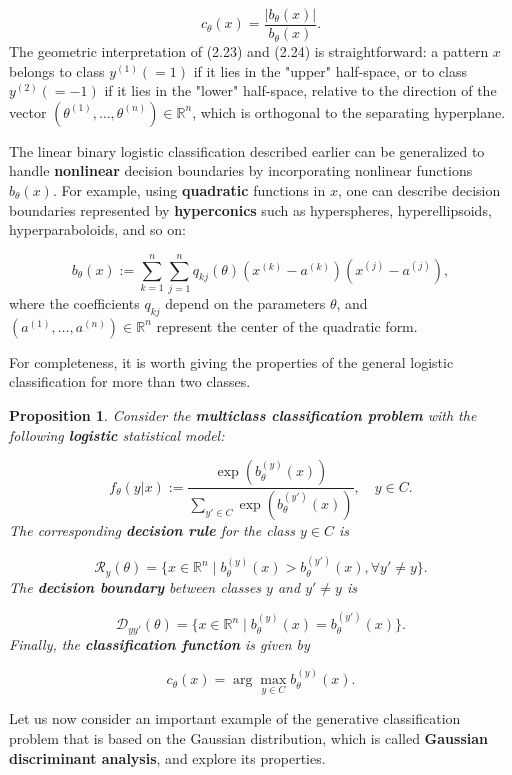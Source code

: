 \documentclass{report}
\newtheorem{proposition}{Proposition}[chapter]
\begin{document}
\begin{equation}
c_\theta(x) = \frac{|b_\theta(x)|}{b_\theta(x)}.
\end{equation}
The geometric interpretation of (2.23) and (2.24) is straightforward: a pattern $x$ belongs to class $y^{(1)} (=1)$ if it lies in the "upper" half-space, or to class $y^{(2)}(=-1)$ if it lies in the "lower" half-space, relative to the direction of the vector $(\theta^{(1)},\dots,\theta^{(n)}) \in \mathbb{R}^n$, which is orthogonal to the separating hyperplane.

The linear binary logistic classification described earlier can be generalized to handle \textbf{nonlinear} decision boundaries by incorporating nonlinear functions $b_\theta(x)$. For example, using \textbf{quadratic} functions in $x$, one can describe decision boundaries represented by \textbf{hyperconics} such as hyperspheres, hyperellipsoids, hyperparaboloids, and so on:

\begin{equation}
b_\theta(x) := \sum_{k=1}^{n}\sum_{j=1}^{n}q_{kj}(\theta)(x^{(k)}-a^{(k)})(x^{(j)} - a^{(j)}),
\end{equation}
where the coefficients $q_{kj}$ depend on the parameters $\theta$, and $(a^{(1)},\dots,a^{(n)}) \in \mathbb{R}^n$ represent the center of the quadratic form.

For completeness, it is worth giving the properties of the general logistic classification for more than two classes.

\begin{proposition}
Consider the \textbf{multiclass classification problem} with the following \textbf{logistic} statistical model:

\begin{equation}
f_\theta(y|x) := \frac{\exp(b_\theta^{(y)}(x))}{\sum_{y' \in C}\exp(b_\theta^{(y')}(x))}, \quad y \in C.
\end{equation}
The corresponding \textbf{decision rule} for the class $y \in C$ is

\begin{equation}
\mathcal{R}_y(\theta) = \{x \in \mathbb{R}^n \mid b_\theta^{(y)}(x) > b_\theta^{(y')}(x), \forall y' \neq y\}.
\end{equation}
The \textbf{decision boundary} between classes $y$ and $y' \neq y$ is

\begin{equation}
\mathcal{D}_{yy'}(\theta) = \{x \in \mathbb{R}^n \mid b_\theta^{(y)}(x) = b_\theta^{(y')}(x)\}.
\end{equation}
Finally, the \textbf{classification function} is given by

\begin{equation}
c_\theta(x) = \arg \max_{y \in C} b_\theta^{(y)}(x).
\end{equation}
\end{proposition}
Let us now consider an important example of the generative classification problem that is based on the Gaussian distribution, which is called \textbf{Gaussian discriminant analysis}, and explore its properties.
\end{document}
